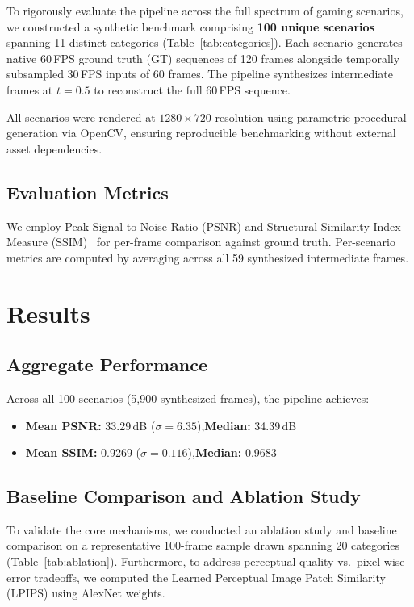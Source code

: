 \documentclass{article}
\begin{document}
To rigorously evaluate the pipeline across the full spectrum of gaming scenarios, we constructed a synthetic benchmark comprising \textbf{100 unique scenarios} spanning 11 distinct categories (Table~\ref{tab:categories}). Each scenario generates native 60\,FPS ground truth (GT) sequences of 120 frames alongside temporally subsampled 30\,FPS inputs of 60 frames. The pipeline synthesizes intermediate frames at $t=0.5$ to reconstruct the full 60\,FPS sequence.

All scenarios were rendered at $1280 \times 720$ resolution using parametric procedural generation via OpenCV, ensuring reproducible benchmarking without external asset dependencies.

\subsection{Evaluation Metrics}

We employ Peak Signal-to-Noise Ratio (PSNR) and Structural Similarity Index Measure (SSIM)~\cite{wang2004image} for per-frame comparison against ground truth. Per-scenario metrics are computed by averaging across all 59 synthesized intermediate frames.

\section{Results}

\subsection{Aggregate Performance}

Across all 100 scenarios (5,900 synthesized frames), the pipeline achieves:
\begin{itemize}
    \item \textbf{Mean PSNR:} 33.29\,dB ($\sigma = 6.35$),\quad \textbf{Median:} 34.39\,dB
    \item \textbf{Mean SSIM:} 0.9269 ($\sigma = 0.116$),\quad \textbf{Median:} 0.9683
\end{itemize}

\subsection{Baseline Comparison and Ablation Study}

To validate the core mechanisms, we conducted an ablation study and baseline comparison on a representative 100-frame sample drawn spanning 20 categories (Table~\ref{tab:ablation}). Furthermore, to address perceptual quality vs.\ pixel-wise error tradeoffs, we computed the Learned Perceptual Image Patch Similarity (LPIPS) using AlexNet weights.
\end{document}
